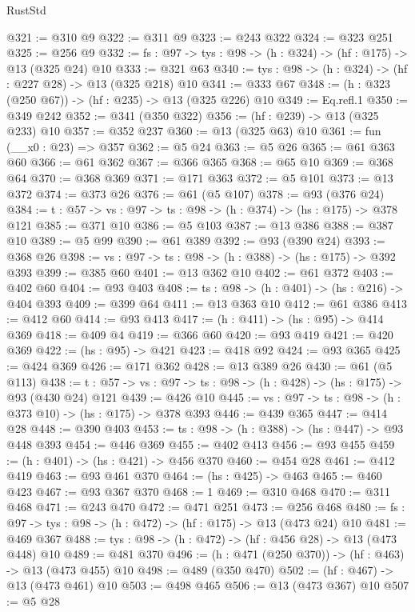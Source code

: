 \begin{lexlean}{RustStd}
\begin{coremodule}
{\begin{coremodule}
{@321 := @310 @9
@322 := @311 @9
@323 := @243 @322
@324 := @323 @251
@325 := @256 @9
@332 := {fs : @97} -> {tys : @98} -> (h : @324) -> (hf : @175) -> @13 (@325 @24) @10
@333 := @321 @63
@340 := {tys : @98} -> (h : @324) -> (hf : @227 @28) -> @13 (@325 @218) @10
@341 := @333 @67
@348 := (h : @323 (@250 @67)) -> (hf : @235) -> @13 (@325 @226) @10
@349 := Eq.refl.{1}
@350 := @349 @242
@352 := @341 (@350 @322)
@356 := (hf : @239) -> @13 (@325 @233) @10
@357 := @352 @237
@360 := @13 (@325 @63) @10
@361 := fun (__x0 : @23) => @357
@362 := @5 @24
@363 := @5 @26
@365 := @61 @363 @60
@366 := @61 @362
@367 := @366 @365
@368 := @65 @10
@369 := @368 @64
@370 := @368 @369
@371 := @171 @363
@372 := @5 @101
@373 := @13 @372
@374 := @373 @26
@376 := @61 (@5 @107)
@378 := @93 (@376 @24)
@384 := {t : @57} -> {vs : @97} -> {ts : @98} -> (h : @374) -> (hs : @175) -> @378 @121
@385 := @371 @10
@386 := @5 @103
@387 := @13 @386
@388 := @387 @10
@389 := @5 @99
@390 := @61 @389
@392 := @93 (@390 @24)
@393 := @368 @26
@398 := {vs : @97} -> {ts : @98} -> (h : @388) -> (hs : @175) -> @392 @393
@399 := @385 @60
@401 := @13 @362 @10
@402 := @61 @372
@403 := @402 @60
@404 := @93 @403
@408 := {ts : @98} -> (h : @401) -> (hs : @216) -> @404 @393
@409 := @399 @64
@411 := @13 @363 @10
@412 := @61 @386
@413 := @412 @60
@414 := @93 @413
@417 := (h : @411) -> (hs : @95) -> @414 @369
@418 := @409 @4
@419 := @366 @60
@420 := @93 @419
@421 := @420 @369
@422 := (hs : @95) -> @421
@423 := @418 @92
@424 := @93 @365
@425 := @424 @369
@426 := @171 @362
@428 := @13 @389 @26
@430 := @61 (@5 @113)
@438 := {t : @57} -> {vs : @97} -> {ts : @98} -> (h : @428) -> (hs : @175) -> @93 (@430 @24) @121
@439 := @426 @10
@445 := {vs : @97} -> {ts : @98} -> (h : @373 @10) -> (hs : @175) -> @378 @393
@446 := @439 @365
@447 := @414 @28
@448 := @390 @403
@453 := {ts : @98} -> (h : @388) -> (hs : @447) -> @93 @448 @393
@454 := @446 @369
@455 := @402 @413
@456 := @93 @455
@459 := (h : @401) -> (hs : @421) -> @456 @370
@460 := @454 @28
@461 := @412 @419
@463 := @93 @461 @370
@464 := (hs : @425) -> @463
@465 := @460 @423
@467 := @93 @367 @370
@468 := 1
@469 := @310 @468
@470 := @311 @468
@471 := @243 @470
@472 := @471 @251
@473 := @256 @468
@480 := {fs : @97} -> {tys : @98} -> (h : @472) -> (hf : @175) -> @13 (@473 @24) @10
@481 := @469 @367
@488 := {tys : @98} -> (h : @472) -> (hf : @456 @28) -> @13 (@473 @448) @10
@489 := @481 @370
@496 := (h : @471 (@250 @370)) -> (hf : @463) -> @13 (@473 @455) @10
@498 := @489 (@350 @470)
@502 := (hf : @467) -> @13 (@473 @461) @10
@503 := @498 @465
@506 := @13 (@473 @367) @10
@507 := @5 @28
}
\end{coremodule}}
\end{coremodule}
\end{lexlean}
